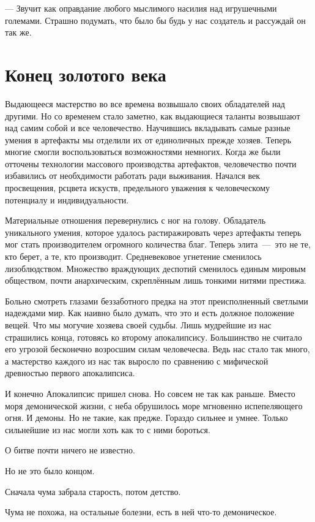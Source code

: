 \documentclass[12pt,a4paper]{article}
\begin{document}
--- Звучит как оправдание любого мыслимого насилия над игрушечными големами. Страшно подумать, что было бы будь у нас создатель и рассуждай он так же.


\section*{Конец золотого века}

Выдающееся мастерство во все времена возвышало своих обладателей над другими. Но со временем стало заметно, как выдающиеся таланты возвышают над самим собой и все человечество. 
Научившись вкладывать самые разные умения в артефакты мы отделили их от единоличных прежде хозяев. Теперь многие смогли воспользоваться возможностями немногих. Когда же были отточены технологии массового производства артефактов, человечество почти избавились от необхдимости работать ради выживания. Начался век просвещения, рсцвета искуств, предельного уважения к человеческому потенциалу и индивидуальности. 

Материальные отношения перевернулись с ног на голову. Обладатель уникального умения, которое удалось растиражировать через артефакты теперь мог стать производителем огромного количества благ. Теперь элита~---~это не те, кто берет, а те, кто производит. Средневековое угнетение сменилось лизоблюдством. Множество враждующих деспотий сменилось единым мировым обществом, почти анархическим, скреплённым лишь тонкими нитями престижа.

Больно смотреть глазами беззаботного предка на этот преисполненный светлыми надеждами мир. Как наивно было думать, что это и есть должное положение вещей. Что мы могучие хозяева своей судьбы. Лишь мудрейшие из нас страшились конца, готовясь ко второму апокалипсису. Большинство не считало его угрозой бесконечно возросшим силам человечесва. Ведь нас стало так много, а мастерство каждого из нас так выросло по сравнению с мифической древностью первого апокалипсиса.

И конечно Апокалипсис пришел снова. Но совсем не так как раньше. Вместо моря демонической жизни, с неба обрушилось море мгновенно испепеляющего огня. И демоны. Но не такие, как предже. Гораздо сильнее и умнее. Только сильнейшие из нас могли хоть как то с ними бороться.


О битве почти ничего не известно. 

Но не это было концом.

Сначала чума забрала старость, потом детство.

Чума не похожа, на остальные болезни, есть в ней что-то демоническое.
\end{document}
